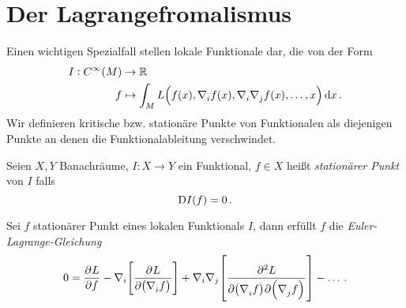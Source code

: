 \section{Der Lagrangefromalismus}
 Einen wichtigen Spezialfall stellen lokale Funktionale dar, die von der Form
\begin{equation}
\begin{split}
I:C^\infty(M)&\to \Reals\\
f&\mapsto\int_M L\left(f(x),\tensor{\nabla}{_i}
f(x),\tensor{\nabla}{_i}\tensor{\nabla}{_j} f(x),\dots,x\right)\dif x\,.
\end{split}
\end{equation}
Wir definieren kritische bzw. stationäre Punkte von Funktionalen als diejenigen
Punkte an denen die Funktionalableitung verschwindet.
\begin{definition}
Seien $X,Y$ Banachräume, $I:X\to Y$ ein Funktional, $f\in X$ heißt
\emph{stationärer Punkt} von $I$ falls
\begin{equation}
\Dif {I}(f)=0\,.
\end{equation}
\end{definition}
\begin{lemma}
Sei $f$ stationärer Punkt eines lokalen Funktionals $I$,
dann erfüllt $f$ die \emph{Euler-Lagrange-Gleichung}
\begin{equation}
0=\dpd{L}{f}-\nabla_i\left[\dpd{L}{\left(\tensor{\nabla}{_i}f\right)}\right]
+\nabla_i\nabla_j\left[\dmd{L}{2}{\left(\tensor{\nabla}{_i}f\right)}{}{\left(\tensor{\nabla}{_j}f\right)}{}
\right]-\dots\,.
\end{equation}
\end{lemma}

